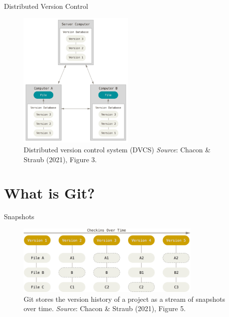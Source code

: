 \documentclass[handout]{beamer}
\begin{document}
\begin{frame}{Distributed Version Control}
  \begin{figure}
	  \includegraphics[width=0.5\textwidth]{figures/fig3_dvcs.png}
	  \caption{Distributed version control system (DVCS) \textit{Source}: Chacon \& Straub (2021), Figure 3.}
  \end{figure} 
\end{frame}


\section{What is Git?}

\begin{frame}{Snapshots}
  \begin{figure}
	  \includegraphics[width=0.8\textwidth]{figures/fig5_snapshots.png}
	  \caption{Git stores the version history of a project as a stream of snapshots over time. \textit{Source}: Chacon \& Straub (2021), Figure 5.}
  \end{figure} 
\end{frame}
\end{document}
